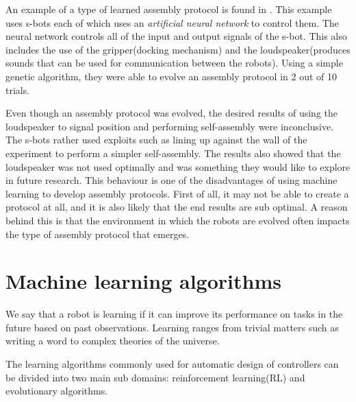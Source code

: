 An example of a type of learned assembly protocol is found in \cite{trianni_evolving_2004}. 
This example uses s-bots each of which uses an \emph{artificial neural network} to control them. 
The neural network controls all of the input and output signals of the s-bot.
This also includes the use of the gripper(docking mechanism) and the loudspeaker(produces sounds that can be used for communication between the robots).
Using a simple genetic algorithm, they were able to evolve an assembly protocol in 2 out of 10 trials.

Even though an assembly protocol was evolved, the desired results of using the loudspeaker to signal position and performing self-assembly were inconclusive.
The s-bots rather used exploits such as lining up against the wall of the experiment to perform a simpler self-assembly.
The results also showed that the loudspeaker was not used optimally and was something they would like to explore in future research.
This behaviour is one of the disadvantages of using machine learning to develop assembly protocols.
First of all, it may not be able to create a protocol at all, and it is also likely that the end results are sub optimal. 
A reason behind this is that the environment in which the robots are evolved often impacts the type of assembly protocol that emerges.

\section{Machine learning algorithms}
\label{sec:learning}
We say that a robot is learning if it can improve its performance on tasks in the future based on past observations.
Learning ranges from trivial matters such as writing a word to complex theories of the universe.

The learning algorithms commonly used for automatic design of controllers can be divided into two main sub domains: reinforcement learning(RL) and evolutionary algorithms\cite{brambilla_swarm_2013}.

